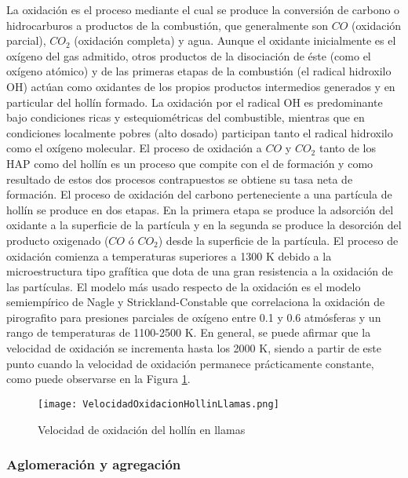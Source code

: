 \par La oxidación es el proceso mediante el cual se produce la conversión de carbono o hidrocarburos a productos de la combustión, que generalmente son $CO$ (oxidación parcial), $CO_2$ (oxidación completa) y agua. Aunque el oxidante inicialmente es el oxígeno del gas admitido, otros productos de la disociación de éste (como el oxígeno atómico) y de las primeras etapas de la combustión (el radical hidroxilo OH) actúan como oxidantes de los propios productos intermedios generados y en particular del hollín formado. La oxidación por el radical OH es predominante bajo condiciones ricas y estequiométricas del combustible, mientras que en condiciones localmente pobres (alto dosado) participan tanto el radical hidroxilo como el oxígeno molecular. El proceso de oxidación a $CO$ y $CO_2$ tanto de los HAP como del hollín es un proceso que compite con el de formación y como resultado de estos dos procesos contrapuestos se obtiene su tasa neta de formación. El proceso de oxidación del carbono perteneciente a una partícula de hollín se produce en dos etapas. En la primera etapa se produce la adsorción del oxidante a la superficie de la partícula y en la segunda se produce la desorción del producto oxigenado ($CO$ ó $CO_2$) desde la superficie de la partícula. El proceso de oxidación comienza a temperaturas superiores a 1300 K debido a la microestructura tipo grafítica que dota de una gran resistencia a la oxidación de las partículas. El modelo más usado respecto de la oxidación es el modelo semiempírico de Nagle y Strickland-Constable que correlaciona la oxidación de pirografito para presiones parciales de oxígeno entre 0.1 y 0.6 atmósferas y un rango de temperaturas de 1100-2500 K. En general, se puede afirmar que la velocidad de oxidación se incrementa hasta los 2000 K, siendo a partir de este punto cuando la velocidad de oxidación permanece prácticamente constante, como puede observarse en la Figura \ref{fig:velocidadoxidacionhollinllamas}.

\begin{figure}[ht]
\centering
	\texttt{[image: VelocidadOxidacionHollinLlamas.png]}	 
	\caption{Velocidad de oxidación del hollín en llamas} \label{fig:velocidadoxidacionhollinllamas}
\end{figure} 

\subsubsection{Aglomeración y agregación}\label{subsub:aglomeracionyagregacion}

